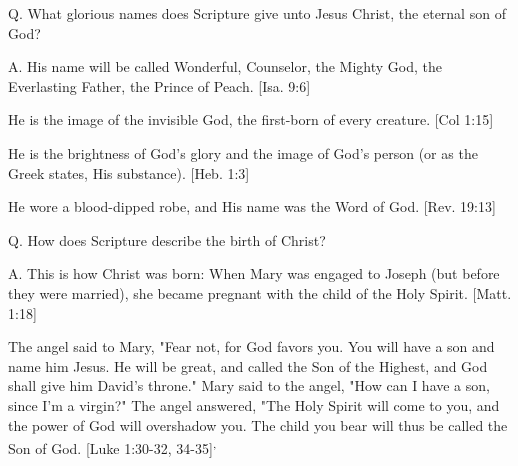 \documentclass[../main.tex]{subfiles}
\begin{document}
	Q. What glorious names does Scripture give unto Jesus Christ, the eternal son of God?
	
	A. His name will be called Wonderful, Counselor, the Mighty God, the Everlasting Father, the Prince of Peach. [Isa. 9:6]
	
	He is the image of the invisible God, the first-born of every creature. [Col 1:15]
	
	He is the brightness of God's glory and the image of God's person (or as the Greek states, His substance). [Heb. 1:3]
	
	He wore a blood-dipped robe, and His name was the Word of God. [Rev. 19:13]
	
	Q. How does Scripture describe the birth of Christ?
	
	A. This is how Christ was born: When Mary was engaged to Joseph (but before they were married), she became pregnant with the child of the Holy Spirit. [Matt. 1:18]
	
	The angel said to Mary, "Fear not, for God favors you. You will have a son and name him Jesus. He will be great, and called the Son of the Highest, and God shall give him David's throne." Mary said to the angel, "How can I have a son, since I'm a virgin?" The angel answered, "The Holy Spirit will come to you, and the power of God will overshadow you. The child you bear will thus be called the Son of God. [Luke 1:30-32, 34-35]\textsuperscript{,}
	
	
	
	
	
	
	
	
	
	
	
	
\end{document}
